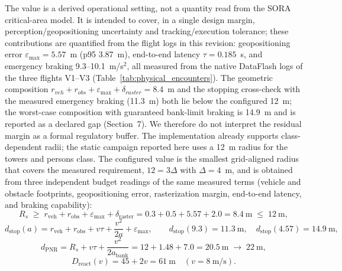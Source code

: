 \documentclass[electronics,article,submit,moreauthors]{Definitions/mdpi}
\DeclareRobustCommand{\deleted}[1]{}%
\DeclareRobustCommand{\added}[1]{#1}%
\DeclareRobustCommand{\deleted}[1]{\textcolor{black}{\sout{#1}}}
\DeclareRobustCommand{\added}[1]{\textcolor{green!50!black}{#1}}
\def\deleted#1{}%
\def\added#1{#1}%
\begin{document}
The value is a derived operational setting, not a quantity read from the SORA critical-area model\deleted{: it}\added{. It} is intended to \deleted{absorb the monocular geopositioning error of the perception front-end, the tracking and execution tolerance of the controller, and a regulatory}\added{cover, in a single design} margin, \deleted{all at once.}\added{perception/geopositioning uncertainty and tracking/execution tolerance; these contributions are quantified from the flight logs in this revision: geopositioning error $\varepsilon_{\max}=5.57$~m (p95 3.87~m), end-to-end latency $\tau=0.185$~s, and emergency braking 9.3--10.1~m/s$^2$, all measured from the native DataFlash logs of the three flights V1--V3 (Table~\ref{tab:physical_encounters}). The geometric composition $r_{veh}+r_{obs}+\varepsilon_{\max}+\delta_{raster}=8.4$~m and the stopping cross-check with the measured emergency braking (11.3~m) both lie below the configured 12~m; the worst-case composition with guaranteed bank-limit braking is 14.9~m and is reported as a declared gap (Section~7). We therefore do not interpret the residual margin as a formal regulatory buffer.} The implementation already supports class-dependent radii; the static campaign reported here uses \deleted{the value of}\added{a} 12~m \added{radius for the }towers and persons\added{ class}. The configured value is the smallest grid-aligned radius that covers the measured requirement, $12 = 3\Delta$ with $\Delta=4$~m, and is obtained from three independent budget readings of the same measured terms (vehicle and obstacle footprints, geopositioning error, rasterization margin, end-to-end latency, and braking capability):
\begin{equation}
R_s \;\ge\; r_{\mathrm{veh}}+r_{\mathrm{obs}}+\varepsilon_{\max}+\delta_{\mathrm{raster}}
      = 0.3+0.5+5.57+2.0 = 8.4~\mathrm{m} \;\le\; 12~\mathrm{m},
\label{eq:rs-geometric}
\end{equation}
\begin{equation}
d_{\mathrm{stop}}(a) = r_{\mathrm{veh}}+r_{\mathrm{obs}}+v\tau+\frac{v^{2}}{2a}+\varepsilon_{\max},
\qquad
d_{\mathrm{stop}}(9.3)=11.3~\mathrm{m}, \quad d_{\mathrm{stop}}(4.57)=14.9~\mathrm{m},
\label{eq:rs-stopping}
\end{equation}
\begin{equation}
d_{\mathrm{PNR}} = R_s+v\tau+\frac{v^{2}}{2a_{\mathrm{bank}}}
= 12+1.48+7.0 = 20.5~\mathrm{m} \;\rightarrow\; 22~\mathrm{m},
\label{eq:pnr}
\end{equation}
\begin{equation}
D_{\mathrm{react}}(v) = 45+2v = 61~\mathrm{m}\quad (v=8~\mathrm{m/s}).
\label{eq:dreact}
\end{equation}
\end{document}
